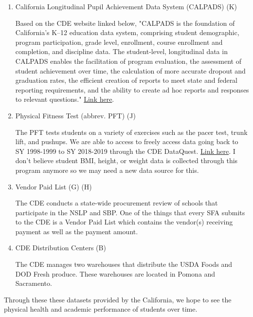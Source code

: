 \documentclass[12pt]{article}
\begin{document}
\begin{enumerate}
	\begin{enumerate}
		\item California Longitudinal Pupil Achievement Data System (CALPADS) (K)
		
		Based on the CDE website linked below, "CALPADS is the foundation of California’s K–12 education data system, comprising student demographic, program participation, grade level, enrollment, course enrollment and completion, and discipline data. The student-level, longitudinal data in CALPADS enables the facilitation of program evaluation, the assessment of student achievement over time, the calculation of more accurate dropout and graduation rates, the efficient creation of reports to meet state and federal reporting requirements, and the ability to create ad hoc reports and responses to relevant questions." \href{https://www.cde.ca.gov/ds/sp/cl/background.asp}{Link here}.
		
		\item Physical Fitness Test (abbrev. PFT) (J)
		
		The PFT tests students on a variety of exercises such as the pacer test, trunk lift, and pushups. We are able to access to freely access data going back to SY 1998-1999 to SY 2018-2019 through the CDE DataQuest. \href{https://data1.cde.ca.gov/dataquest/}{Link here}. I don't believe student BMI, height, or weight data is collected through this program anymore so we may need a new data source for this.
		
		\item Vendor Paid List (G) (H)
		
		The CDE conducts a state-wide procurement review of schools that participate in the NSLP and SBP. One of the things that every SFA submits to the CDE is a Vendor Paid List which contains the vendor(s) receiving payment as well as the payment amount. 
		
		\item CDE Distribution Centers (B)
		
		The CDE manages two warehouses that distribute the USDA Foods and DOD Fresh produce. These warehouses are located in Pomona and Sacramento. %
	\end{enumerate}
	
	Through these these datasets provided by the California, we hope to see the physical health and academic performance of students over time.
	
\end{enumerate}
\end{document}
